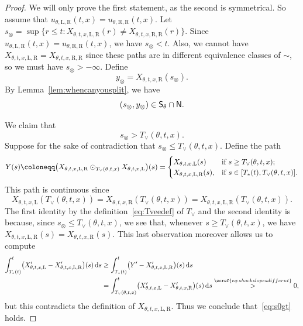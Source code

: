 \documentclass[AHL,Unicode,longabstracts]{cedram}
\newcounter{setofcase}
\newcounter{case}[setofcase]
\newcommand*\ssS{\mathsf{S}}
\newcommand*\ssN{\mathsf{N}}
\newcommand*\st{\mathrel{:}}
\newcommand*\dif{\mathrm{d}}
\newcommand*\Left{\mathrm{L}}
\newcommand*\Right{\mathrm{R}}
\let\oldin\in
\renewcommand{\in}{\mathchoice{\oldin}{\oldin}{\,\oldin\,}{\,\oldin\,}}
\let\oldcap\cap
\renewcommand{\cap}{\mathchoice{\oldcap}{\oldcap}{\,\oldcap\,}{\,\oldcap\,}}
\let\originalleft\left
\let\originalright\right
\renewcommand{\left}{\mathopen{}\mathclose\bgroup\originalleft}
\renewcommand{\right}{\aftergroup\egroup\originalright}
\begin{document}
\begin{proof}
We will only prove the first statement, as the second is symmetrical. So assume that $u_{\theta,\Left,\Right}(t,x)=u_{\theta,\Right,\Right}(t,x)$. Let $s_{\otimes}=\sup\{r\le t\st X_{\theta,t,x,\Left,\Right}(r)\ne X_{\theta,t,x,\Right,\Right}(r)\}$. Since $u_{\theta,\Left,\Right}(t,x)=u_{\theta,\Right,\Right}(t,x)$, we have $s_{\otimes}<t$. Also, we cannot have $X_{\theta,t,x,\Left,\Right}=X_{\theta,t,x,\Right,\Right}$ since these paths are in different equivalence classes of $\sim$, so we must have $s_{\otimes}>-\infty$. Define
\begin{equation}\label{eq:y0def}
y_{\otimes}=X_{\theta,t,x,\Right}(s_{\otimes}).
\end{equation}
By Lemma~\ref{lem:whencanyousplit}, we have
\begin{equation}\label{eq:s0y0inSN}
(s_{\otimes},y_{\otimes})\in\ssS_{\theta}\cap\ssN.
\end{equation}

We claim that
\begin{equation}\label{eq:s0gt}
s_{\otimes}>T_{\vee}(\theta,t,x).
\end{equation}
Suppose for the sake of contradiction that $s_{\otimes}\le T_{\vee}(\theta,t,x)$. Define the path
\[
Y(s)\coloneqq\left(X_{\theta,t,x,\Left,\Right}\odot_{T_{\vee}(\theta,t,x)}X_{\theta,t,x,\Left}\right)(s)=
\begin{cases}
X_{\theta,t,x,\Left}(s) & \text{if }s\ge T_{\vee}(\theta,t,x);\\
X_{\theta,t,x,\Left,\Right}(s), & \text{if }s\in[T_{*}(t),T_{\vee}(\theta,t,x)].
\end{cases}
\]
This path is continuous since
\[
X_{\theta,t,x,\Left}(T_{\vee}(\theta,t,x))=X_{\theta,t,x,\Right}(T_{\vee}(\theta,t,x))=X_{\theta,t,x,\Left,\Right}(T_{\vee}(\theta,t,x)).
\]
The first identity by the definition~\eqref{eq:Tveedef} of $T_{\vee}$ and the second identity is because, since $s_{\otimes}\le T_{\vee}(\theta,t,x)$, we see that, whenever $s\ge T_{\vee}(\theta,t,x)$, we have $X_{\theta,t,x,\Left,\Right}(s)=X_{\theta,t,x,\Right}(s)$. This last observation moreover allows us to compute
\begin{align*}
\int_{T_{*}(t)}^{t}\left(X_{\theta,t,x,\Left}'-X_{\theta,t,x,\Left,\Right}'\right)(s)\,\dif s & \ge\int_{T_{*}(t)}^{t}\left(Y'-X_{\theta,t,x,\Left,\Right}'\right)(s)\,\dif s\\
& =\int_{T_{\vee}(\theta,t,x)}^{t}\left(X'_{\theta,t,x,\Left}-X'_{\theta,t,x,\Right}\right)(s)\,\dif s\overset{\zcref{eq:shockslopesdiffernt}}{>}0,
\end{align*}
but this contradicts the definition of $X_{\theta,t,x,\Left,\Right}$. Thus we conclude that~\eqref{eq:s0gt} holds.


\end{proof}
\end{document}
